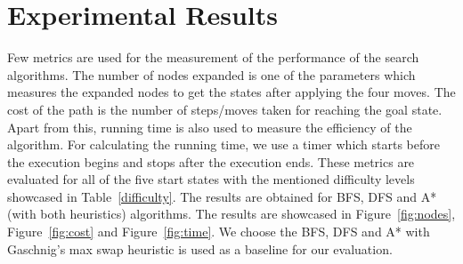 \documentclass{svproc}
\begin{document}
\section{Experimental Results}
\noindent Few metrics are used for the measurement of the performance of the search algorithms. The number of nodes expanded is one of the parameters which measures the  expanded nodes to get the states after applying the four moves. The cost of the path is the number of steps/moves taken for reaching the goal state. Apart from this, running time is also used to measure the efficiency of the algorithm. For calculating the running time, we use a timer which starts before the execution begins and stops after the execution ends. These metrics are evaluated for all of the five start states with the mentioned difficulty levels showcased in Table~\ref{difficulty}. The results are obtained for BFS, DFS and A* (with both heuristics) algorithms. The results are showcased in Figure~\ref{fig:nodes}, Figure~\ref{fig:cost} and Figure~\ref{fig:time}. We choose the BFS, DFS and A* with Gaschnig's max swap heuristic is used as a baseline for our evaluation.\\
\end{document}
